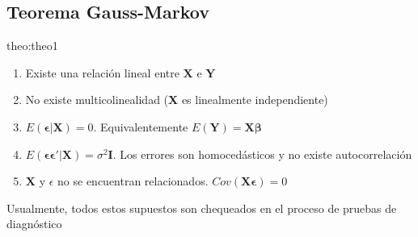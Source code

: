 \subsection{Teorema Gauss-Markov}
\begin{theo}[Supuestos]{theo:theo1}
\begin{enumerate}
	\item Existe una relaci\'on lineal entre $\mathbf{X}$ e \textbf{$\mathbf{Y}$}
	\item No existe multicolinealidad (\textbf{X} es linealmente independiente)
	\item $E(\mathbf{\epsilon}|\mathbf{X})=0$. Equivalentemente $E(\mathbf{Y})=$\textbf{$\mathbf{X\beta}$}
	\item $E(\mathbf{\epsilon\epsilon'}|\mathbf{X})=\sigma^{2}\mathbf{I}$.
	Los errores son homoced\'asticos y no existe autocorrelaci\'on
	\item \textbf{$\mathbf{X}$} y $\epsilon$ no se encuentran relacionados.
	$Cov(\mathbf{X\epsilon})=0$ 
\end{enumerate}%
\end{theo}
Usualmente, todos estos supuestos son chequeados en el proceso de pruebas de diagn\'ostico

